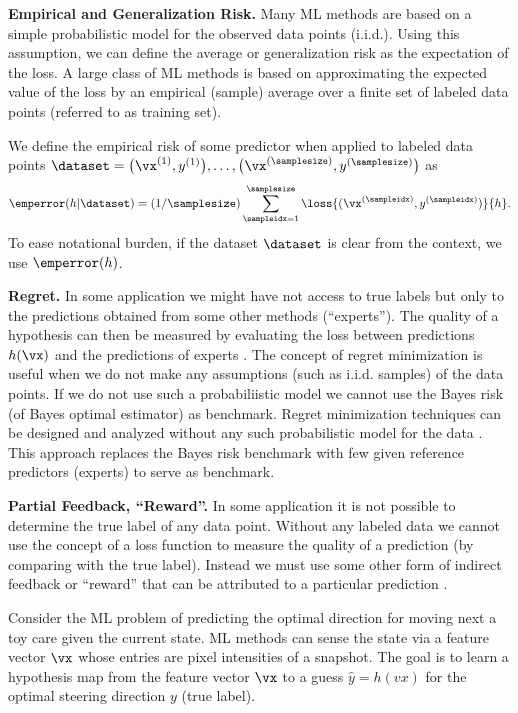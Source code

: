 \documentclass[12pt]{report}
\begin{document}
{\bf Empirical and Generalization Risk.} 
Many ML methods are based on a simple probabilistic model for the 
observed data points (i.i.d.). Using this assumption, we can define the 
average or generalization risk as the expectation of the loss. A large class 
of ML methods is based on approximating the expected value of the loss 
by an empirical (sample) average over a finite set of labeled data points 
(referred to as training set). 

We define the empirical risk of some predictor when applied to labeled data points $\dataset=\big(\vx^{(1)},y^{(1)}\big),\ldots,\big(\vx^{(\samplesize)},y^{(\samplesize)}\big)$ 
as 
\begin{equation} 
\label{eq_def_emp_error_101}
\emperror(h|\dataset) = (1/\samplesize)\sum_{\sampleidx=1}^{\samplesize} \loss{(\vx^{(\sampleidx)},y^{(\sampleidx)})}{h}.  
\end{equation} 
To ease notational burden, if the dataset $\dataset$ is clear from the context, 
we use $\emperror(h)$. 




{\bf Regret.} In some application we might have not access to true labels 
but only to the predictions obtained from some other methods (``experts''). 
The quality of a hypothesis can then be measured by evaluating the loss 
between predictions $h(\vx)$ and the predictions of experts \cite{HazanOCO}. 
The concept of regret minimization is useful when we do not make any 
assumptions (such as i.i.d. samples) of the data points. If we do not use 
such a probabiliistic model we cannot use the Bayes risk (of Bayes optimal 
estimator) as benchmark. Regret minimization 
techniques can be designed and analyzed without any such probabilistic model 
for the data \cite{PredictionLearningGames}. This approach replaces the Bayes risk 
benchmark with few given reference predictors (experts) to serve as benchmark. 

{\bf Partial Feedback, ``Reward''.}  
In some application it is not possible to determine the true label of any data point. 
Without any labeled data we cannot use the concept of a loss function to measure 
the quality of a prediction (by comparing with the true label). Instead we must use 
some other form of indirect feedback or ``reward'' that can be attributed to a particular 
prediction \cite{PredictionLearningGames,SuttonEd2}. 

Consider the ML problem of predicting the optimal direction for 
moving next a toy care given the current state. ML methods can sense the 
state via a feature vector $\vx$ whose entries are pixel intensities of a 
snapshot. The goal is to learn a hypothesis map from the feature vector 
$\vx$ to a guess $\hat{y} = h(vx)$ for the optimal steering direction $y$ (true label). 
\end{document}
